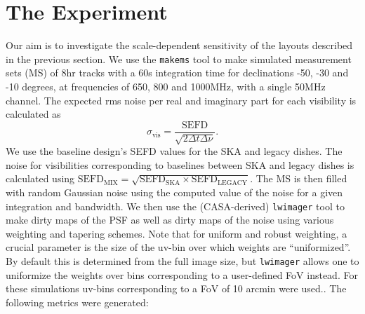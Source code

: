 \documentclass[sfheadings,a4paper,times,9pt,floats,floatfix]{article}
\begin{document}
\section{The Experiment}\label{sec:exp}
Our aim is to investigate the scale-dependent sensitivity of the layouts described in the previous section.
We use the \texttt{makems} tool to make simulated measurement sets (MS) of 8hr tracks with a 60s integration time for
declinations -50, -30 and -10 degrees, at frequencies of 650, 800 and 1000MHz, with a single 50MHz channel. The expected rms noise
per real and imaginary part for each visibility is calculated as 
\begin{equation}
\sigma_{\text{vis}} = \frac{\text{SEFD}}{\sqrt{2\Delta t\Delta \nu}}.
\end{equation}
We use the baseline design's SEFD values for the SKA and legacy dishes. The noise for visibilities corresponding to baselines
between SKA and legacy dishes is calculated using $\text{SEFD}_{\text{MIX}}=\sqrt{\text{SEFD}_{\text{SKA}} \times
\text{SEFD}_{\text{LEGACY}}}$. The MS is then filled with random Gaussian noise using the computed value of the noise for a
given integration and bandwidth. We then use the (CASA-derived) \texttt{lwimager} tool to make dirty maps of
the PSF as well as dirty maps of the noise using various weighting and tapering schemes. Note that for uniform and
robust weighting, a crucial parameter is the size of the uv-bin over which weights are “uniformized”. By default this is
determined from the full image size, but \texttt{lwimager} allows one to uniformize the weights over bins corresponding
to a user-defined FoV instead. For these simulations uv-bins corresponding to a FoV of 10 arcmin were used.. The
following metrics were generated:
\end{document}
